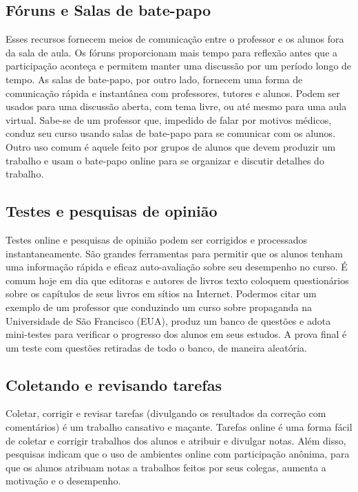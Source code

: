 \subsection{Fóruns e Salas de bate-papo}


Esses recursos fornecem meios de comunicação entre o professor e os alunos fora da sala de aula. Os fóruns proporcionam mais tempo para reflexão antes que a participação aconteça e permitem manter uma discussão por um período longo de tempo. As salas de bate-papo, por outro lado, fornecem uma forma de comunicação rápida e instantânea com professores, tutores e alunos. Podem ser usados para uma discussão aberta, com tema livre, ou até mesmo para uma aula virtual. Sabe-se de um professor que, impedido de falar por motivos médicos, conduz seu curso usando salas de bate-papo para se comunicar com os alunos. Outro uso comum é aquele feito por grupos de alunos que devem produzir um trabalho e usam o bate-papo online para se organizar e discutir detalhes do trabalho.

\subsection{Testes e pesquisas de opinião}


Testes online e pesquisas de opinião podem ser corrigidos e processados instantaneamente. São grandes ferramentas para 
permitir que os alunos tenham uma informação rápida e eficaz auto-avaliação sobre seu desempenho no curso. É comum hoje em dia que editoras e autores de livros texto coloquem questionários sobre os capítulos de seus livros em sítios na Internet. Podermos citar um exemplo de um professor que conduzindo um curso sobre propaganda na Universidade de São Francisco (EUA), produz um banco de questões e adota mini-testes para verificar o progresso dos alunos em seus estudos. A prova final é um teste com questões retiradas de todo o banco, de maneira aleatória.

\subsection{Coletando e revisando tarefas}


Coletar, corrigir e revisar tarefas (divulgando os resultados da correção com comentários) é um trabalho cansativo e maçante. Tarefas online é uma forma fácil de coletar e corrigir trabalhos dos alunos e atribuir e divulgar notas. Além disso, pesquisas indicam que o uso de ambientes online com participação anônima, para que os alunos atribuam notas a trabalhos feitos por seus colegas, aumenta a motivação e o desempenho.

